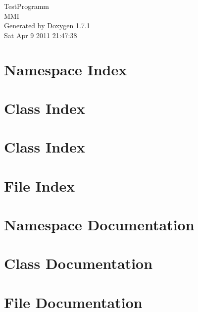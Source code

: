 \documentclass[a4paper]{book}
\begin{document}
\begin{titlepage}
\vspace*{7cm}
\begin{center}
{\Large TestProgramm \\[1ex]\large MMI }\\
\vspace*{1cm}
{\large Generated by Doxygen 1.7.1}\\
\vspace*{0.5cm}
{\small Sat Apr 9 2011 21:47:38}\\
\end{center}
\end{titlepage}
\clearemptydoublepage
{}
\tableofcontents
\clearemptydoublepage
{}
\chapter{Namespace Index}

\chapter{Class Index}

\chapter{Class Index}

\chapter{File Index}

\chapter{Namespace Documentation}

\chapter{Class Documentation}



\chapter{File Documentation}




\printindex
\end{document}
